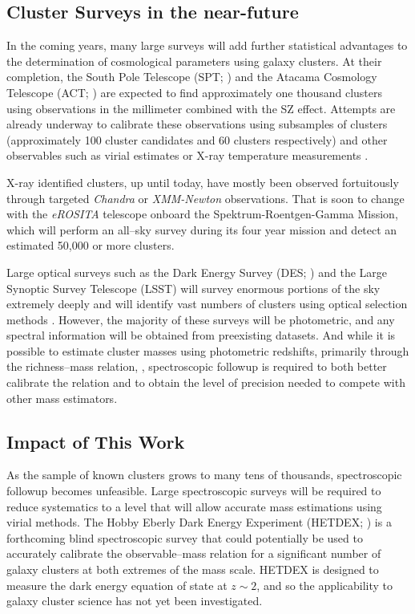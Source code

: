 \documentclass[12pt]{article}
\begin{document}
\subsection{Cluster Surveys in the near-future}
In the coming years, many large surveys will add further statistical advantages to the determination of cosmological parameters using galaxy clusters. At their completion, the South Pole Telescope (SPT; \citealt{Carlstrom2011}) and the Atacama Cosmology Telescope (ACT; \citealt{Swetz2011}) are expected to find approximately one thousand clusters using observations in the millimeter combined with the SZ effect. Attempts are already underway to calibrate these observations using subsamples of clusters (approximately 100 cluster candidates and 60 clusters respectively) and other observables such as virial estimates or X-ray temperature measurements . 

X-ray identified clusters, up until today, have mostly been observed fortuitously through targeted \textit{Chandra} or \textit{XMM-Newton} observations. That is soon to change with the \textit{eROSITA} telescope onboard the Spektrum-Roentgen-Gamma Mission, which will perform an all--sky survey during its four year mission and detect an estimated 50,000 or more clusters.

Large optical surveys such as the Dark Energy Survey (DES; \citealt{DES2005}) and the Large Synoptic Survey Telescope (LSST) will survey enormous portions of the sky extremely deeply and will identify vast numbers of clusters using optical selection methods . However, the majority of these surveys will be photometric, and any spectral information will be obtained from preexisting datasets. And while it is possible to estimate cluster masses using photometric redshifts, primarily through the richness--mass relation, , spectroscopic followup is required to both better calibrate the relation and to obtain the level of precision needed to compete with other mass estimators. 

\subsection{Impact of This Work}
As the sample of known clusters grows to many tens of thousands, spectroscopic followup becomes unfeasible. Large spectroscopic surveys will be required to reduce systematics to a level that will allow accurate mass estimations using virial methods. The Hobby Eberly Dark Energy Experiment (HETDEX; \citealt{Hill2008}) is a forthcoming blind spectroscopic survey that could potentially be used to accurately calibrate the observable--mass relation for a significant number of galaxy clusters at both extremes of the mass scale. HETDEX is designed to measure the dark energy equation of state at $z\sim2$, and so the applicability to galaxy cluster science has not yet been investigated.
\end{document}
